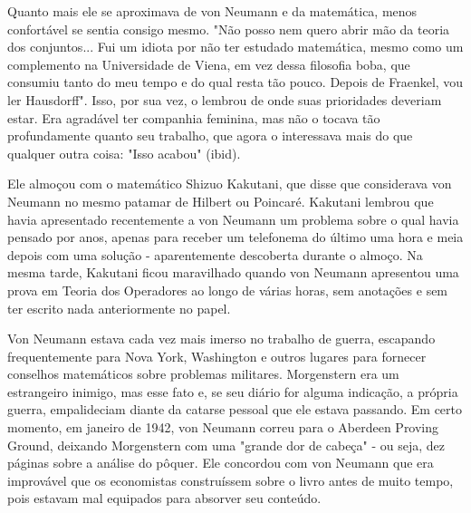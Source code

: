 \documentclass[12pt]{article}
\begin{document}
Quanto mais ele se aproximava de von Neumann e da matemática, menos confortável se sentia consigo mesmo. "Não posso nem quero abrir mão da teoria dos conjuntos... Fui um idiota por não ter estudado matemática, mesmo como um complemento na Universidade de Viena, em vez dessa filosofia boba, que consumiu tanto do meu tempo e do qual resta tão pouco. Depois de Fraenkel, vou ler Hausdorff". Isso, por sua vez, o lembrou de onde suas prioridades deveriam estar. Era agradável ter companhia feminina, mas não o tocava tão profundamente quanto seu trabalho, que agora o interessava mais do que qualquer outra coisa: "Isso acabou" (ibid).

Ele almoçou com o matemático Shizuo Kakutani, que disse que considerava von Neumann no mesmo patamar de Hilbert ou Poincaré. Kakutani lembrou que havia apresentado recentemente a von Neumann um problema sobre o qual havia pensado por anos, apenas para receber um telefonema do último uma hora e meia depois com uma solução - aparentemente descoberta durante o almoço. Na mesma tarde, Kakutani ficou maravilhado quando von Neumann apresentou uma prova em Teoria dos Operadores ao longo de várias horas, sem anotações e sem ter escrito nada anteriormente no papel.

Von Neumann estava cada vez mais imerso no trabalho de guerra, escapando frequentemente para Nova York, Washington e outros lugares para fornecer conselhos matemáticos sobre problemas militares. Morgenstern era um estrangeiro inimigo, mas esse fato e, se seu diário for alguma indicação, a própria guerra, empalideciam diante da catarse pessoal que ele estava passando. Em certo momento, em janeiro de 1942, von Neumann correu para o Aberdeen Proving Ground, deixando Morgenstern com uma "grande dor de cabeça" - ou seja, dez páginas sobre a análise do pôquer. Ele concordou com von Neumann que era improvável que os economistas construíssem sobre o livro antes de muito tempo, pois estavam mal equipados para absorver seu conteúdo.
\end{document}

